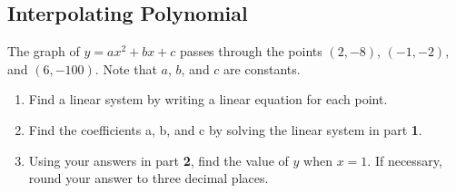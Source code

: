 
\subsection{Interpolating Polynomial}
\label{sub_sec:interpolating_polynomial}

\begin{question}
  \label{qst:interpolating_polynomial}

  The graph of $y = ax^2 + bx + c$ passes through the points $(2, -8)$, $(-1,
  -2)$, and $(6, -100)$. Note that $a$, $b$, and $c$ are constants.
  \begin{enumerate}
    \label{enum:qst_interpolating_polynomial}

    \item Find a linear system by writing a linear equation for each point.

    \item Find the coefficients a, b, and c by solving the linear system in part
      \textbf{1}.

    \item Using your answers in part \textbf{2}, find the value of $y$ when $x =
      1$. If necessary, round your answer to three decimal places.
  \end{enumerate}
\end{question}

